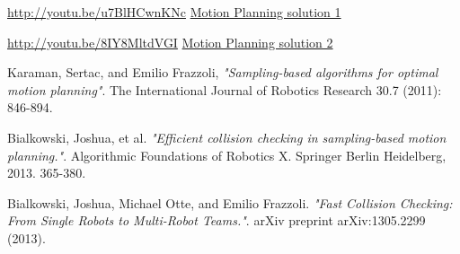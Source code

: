 \documentclass{article}
\begin{document}
    \url{http://youtu.be/u7BlHCwnKNc}
    \href{http://youtu.be/u7BlHCwnKNc}{ Motion Planning solution 1 }

    \url{http://youtu.be/8IY8MltdVGI}
    \href{http://youtu.be/8IY8MltdVGI}{ Motion Planning solution 2 }

    

\begin{thebibliography}{9}

  Karaman, Sertac, and Emilio Frazzoli,
  \emph{"Sampling-based algorithms for optimal motion planning"}.
  The International Journal of Robotics Research 30.7 (2011): 846-894.

  Bialkowski, Joshua, et al.
  \emph{"Efficient collision checking in sampling-based motion planning."}. Algorithmic Foundations of Robotics X. Springer Berlin Heidelberg, 2013. 365-380.

  Bialkowski, Joshua, Michael Otte, and Emilio Frazzoli. 
  \emph{"Fast Collision Checking: From Single Robots to Multi-Robot Teams."}. 
  arXiv preprint arXiv:1305.2299 (2013).

\end{thebibliography}
\end{document}
